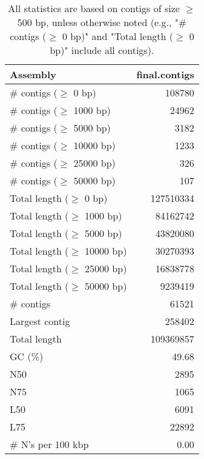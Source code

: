 \documentclass[12pt,a4paper]{article}
\begin{document}
\begin{table}[ht]
\begin{center}
\caption{All statistics are based on contigs of size $\geq$ 500 bp, unless otherwise noted (e.g., "\# contigs ($\geq$ 0 bp)" and "Total length ($\geq$ 0 bp)" include all contigs).}
\begin{tabular}{|l*{1}{|r}|}
\hline
Assembly & final.contigs \\ \hline
\# contigs ($\geq$ 0 bp) & 108780 \\ \hline
\# contigs ($\geq$ 1000 bp) & 24962 \\ \hline
\# contigs ($\geq$ 5000 bp) & 3182 \\ \hline
\# contigs ($\geq$ 10000 bp) & 1233 \\ \hline
\# contigs ($\geq$ 25000 bp) & 326 \\ \hline
\# contigs ($\geq$ 50000 bp) & 107 \\ \hline
Total length ($\geq$ 0 bp) & 127510334 \\ \hline
Total length ($\geq$ 1000 bp) & 84162742 \\ \hline
Total length ($\geq$ 5000 bp) & 43820080 \\ \hline
Total length ($\geq$ 10000 bp) & 30270393 \\ \hline
Total length ($\geq$ 25000 bp) & 16838778 \\ \hline
Total length ($\geq$ 50000 bp) & 9239419 \\ \hline
\# contigs & 61521 \\ \hline
Largest contig & 258402 \\ \hline
Total length & 109369857 \\ \hline
GC (\%) & 49.68 \\ \hline
N50 & 2895 \\ \hline
N75 & 1065 \\ \hline
L50 & 6091 \\ \hline
L75 & 22892 \\ \hline
\# N's per 100 kbp & 0.00 \\ \hline
\end{tabular}
\end{center}
\end{table}
\end{document}
